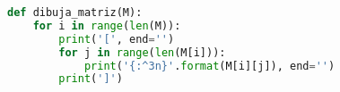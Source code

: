 \begin{lstlisting}[language=python, caption=Función dibuja\_matriz()]
def dibuja_matriz(M):
    for i in range(len(M)):
        print('[', end='')
        for j in range(len(M[i])):
            print('{:^3n}'.format(M[i][j]), end='')
        print(']')
\end{lstlisting}